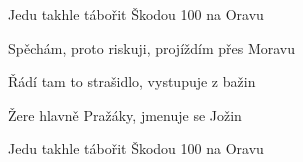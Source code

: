 \begin{song}
\bigskip

Jedu takhle tábořit Škodou 100 na Oravu \par
{}Spěchám, proto riskuji, projíždím přes Moravu \par
{}Řádí tam to strašidlo, vystupuje
z bažin \par
{}Žere hlavně Pražáky, jmenuje se
Jožin \par

\bigskip

 \par
{} \par
{} \par
{} \par

\bigskip

Jedu takhle tábořit Škodou 100 na
Oravu \par

\end{song}
